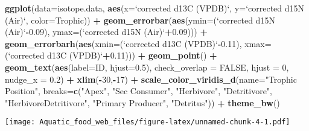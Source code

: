 \documentclass[]{article}
\newenvironment{Shaded}{\begin{snugshade}}{\end{snugshade}}
\newcommand{\KeywordTok}[1]{\textcolor[rgb]{0.13,0.29,0.53}{\textbf{#1}}}
\newcommand{\DataTypeTok}[1]{\textcolor[rgb]{0.13,0.29,0.53}{#1}}
\newcommand{\DecValTok}[1]{\textcolor[rgb]{0.00,0.00,0.81}{#1}}
\newcommand{\FloatTok}[1]{\textcolor[rgb]{0.00,0.00,0.81}{#1}}
\newcommand{\StringTok}[1]{\textcolor[rgb]{0.31,0.60,0.02}{#1}}
\newcommand{\OtherTok}[1]{\textcolor[rgb]{0.56,0.35,0.01}{#1}}
\newcommand{\OperatorTok}[1]{\textcolor[rgb]{0.81,0.36,0.00}{\textbf{#1}}}
\newcommand{\NormalTok}[1]{#1}
\begin{document}
\begin{Shaded}
\begin{Highlighting}[]
\KeywordTok{ggplot}\NormalTok{(}\DataTypeTok{data=}\NormalTok{isotope.data, }\KeywordTok{aes}\NormalTok{(}\DataTypeTok{x=}\StringTok{`}\DataTypeTok{corrected d13C (VPDB)}\StringTok{`}\NormalTok{, }\DataTypeTok{y=}\StringTok{`}\DataTypeTok{corrected d15N (Air)}\StringTok{`}\NormalTok{, }\DataTypeTok{color=}\NormalTok{Trophic)) }\OperatorTok{+}\StringTok{ }
\StringTok{  }\KeywordTok{geom_errorbar}\NormalTok{(}\KeywordTok{aes}\NormalTok{(}\DataTypeTok{ymin=}\NormalTok{(}\StringTok{`}\DataTypeTok{corrected d15N (Air)}\StringTok{`}\OperatorTok{-}\FloatTok{0.09}\NormalTok{), }\DataTypeTok{ymax=}\NormalTok{(}\StringTok{`}\DataTypeTok{corrected d15N (Air)}\StringTok{`}\OperatorTok{+}\FloatTok{0.09}\NormalTok{))) }\OperatorTok{+}\StringTok{ }
\StringTok{  }\KeywordTok{geom_errorbarh}\NormalTok{(}\KeywordTok{aes}\NormalTok{(}\DataTypeTok{xmin=}\NormalTok{(}\StringTok{`}\DataTypeTok{corrected d13C (VPDB)}\StringTok{`}\OperatorTok{-}\FloatTok{0.11}\NormalTok{), }\DataTypeTok{xmax=}\NormalTok{(}\StringTok{`}\DataTypeTok{corrected d13C (VPDB)}\StringTok{`}\OperatorTok{+}\FloatTok{0.11}\NormalTok{))) }\OperatorTok{+}\StringTok{ }
\StringTok{  }\KeywordTok{geom_point}\NormalTok{() }\OperatorTok{+}
\StringTok{  }\KeywordTok{geom_text}\NormalTok{(}\KeywordTok{aes}\NormalTok{(}\DataTypeTok{label=}\NormalTok{ID, }\DataTypeTok{hjust=}\FloatTok{0.5}\NormalTok{), }\DataTypeTok{check_overlap =} \OtherTok{FALSE}\NormalTok{, }\DataTypeTok{hjust =} \DecValTok{0}\NormalTok{, }\DataTypeTok{nudge_x =} \FloatTok{0.2}\NormalTok{) }\OperatorTok{+}\StringTok{ }\KeywordTok{xlim}\NormalTok{(}\OperatorTok{-}\DecValTok{30}\NormalTok{,}\OperatorTok{-}\DecValTok{17}\NormalTok{) }\OperatorTok{+}
\StringTok{  }\KeywordTok{scale_color_viridis_d}\NormalTok{(}\DataTypeTok{name=}\StringTok{"Trophic Position"}\NormalTok{, }\DataTypeTok{breaks=}\KeywordTok{c}\NormalTok{(}\StringTok{"Apex"}\NormalTok{, }\StringTok{"Sec Consumer"}\NormalTok{, }\StringTok{"Herbivore"}\NormalTok{, }\StringTok{"Detritivore"}\NormalTok{,}
                                                          \StringTok{"HerbivoreDetritivore"}\NormalTok{, }\StringTok{"Primary Producer"}\NormalTok{, }\StringTok{"Detritus"}\NormalTok{)) }\OperatorTok{+}\StringTok{ }\KeywordTok{theme_bw}\NormalTok{()}
\end{Highlighting}
\end{Shaded}

\texttt{[image: Aquatic\_food\_web\_files/figure-latex/unnamed-chunk-4-1.pdf]}
\end{document}
